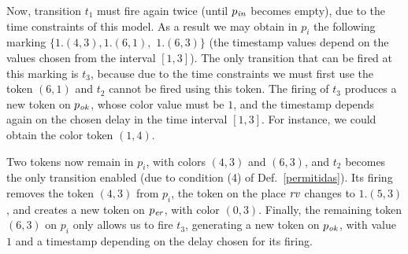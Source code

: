 Now, transition $t_1$ must fire again twice (until $p_{\it in}$ 
becomes empty), due to the time constraints of this model. 
As a result we may obtain in $p_i$ the following marking
$\{1.(4,3), 1.(6,1),$
$ 1.(6,3)\}$ (the timestamp values depend on the values
chosen from the interval $[1,3]$).
% 
The only transition that can be fired at this marking
is $t_3$, because due to the time constraints 
we must first use the token $(6,1)$
and $t_2$ cannot be fired using this token.
The firing of $t_3$ produces a new token on $p_{\it ok}$,
whose color value must be $1$, and the timestamp
depends again on the chosen delay in the time interval
$[1,3]$. For instance, we could obtain the 
color token $(1,4)$. 

Two tokens now remain in $p_i$, with colors  $(4,3)$ and 
$(6,3)$, and $t_2$ becomes the only transition
enabled (due to condition (4) of Def.\ \ref{permitidas}).
Its firing removes the token $(4,3)$ from $p_i$,
the token on the place ${\it rv}$ changes to $1.(5,3)$,  
and creates a new token on $p_{\it er}$, with color $(0,3)$. 
%
% 
Finally, the remaining token $(6,3)$ on $p_i$ 
only allows us to fire $t_3$, generating a new token
on $p_{\it ok}$, with value $1$ and a timestamp
depending on the delay chosen for its firing.
\eex


